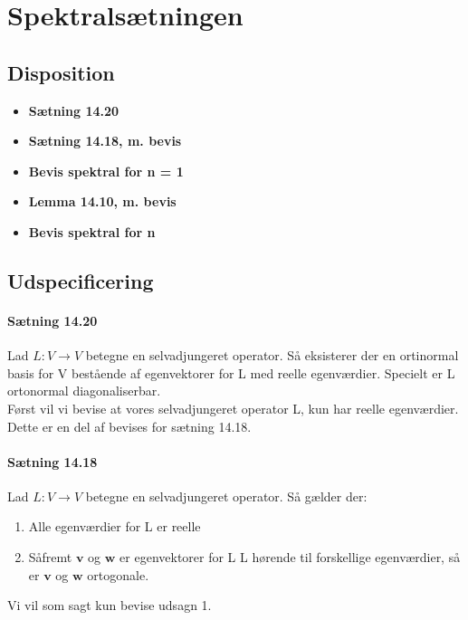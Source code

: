 \documentclass[paper=a4, fontsize=11pt]{scrartcl} %
\begin{document}
			
			\newpage
			
			\section{Spektralsætningen}
			
			\subsection{Disposition}
			
			\begin{itemize}
				\item \textbf{Sætning 14.20}
				\item \textbf{Sætning 14.18, m. bevis}
				\item \textbf{Bevis spektral for n = 1}
				\item \textbf{Lemma 14.10, m. bevis}
				\item \textbf{Bevis spektral for n}
			\end{itemize}
			
			\subsection{Udspecificering}
			
			
			\paragraph{Sætning 14.20} Lad $L:V\rightarrow V$ betegne en selvadjungeret operator. Så eksisterer der en ortinormal basis for V bestående af egenvektorer for L med reelle egenværdier. Specielt er L ortonormal diagonaliserbar.  \\ 
			
			Først vil vi bevise at vores selvadjungeret operator L, kun har reelle egenværdier. Dette er en del af bevises for sætning 14.18.
			
			\paragraph{Sætning 14.18} Lad $L:V\rightarrow V$ betegne en selvadjungeret operator. Så gælder der:
			\begin{enumerate}
				\item Alle egenværdier for L er reelle
				\item Såfremt $\mathbf{v}$ og $\mathbf{w}$ er egenvektorer for L L hørende til forskellige egenværdier, så er $\mathbf{v}$ og $\mathbf{w}$ ortogonale.
			\end{enumerate}
			Vi vil som sagt kun bevise udsagn 1.
			
\end{document}
